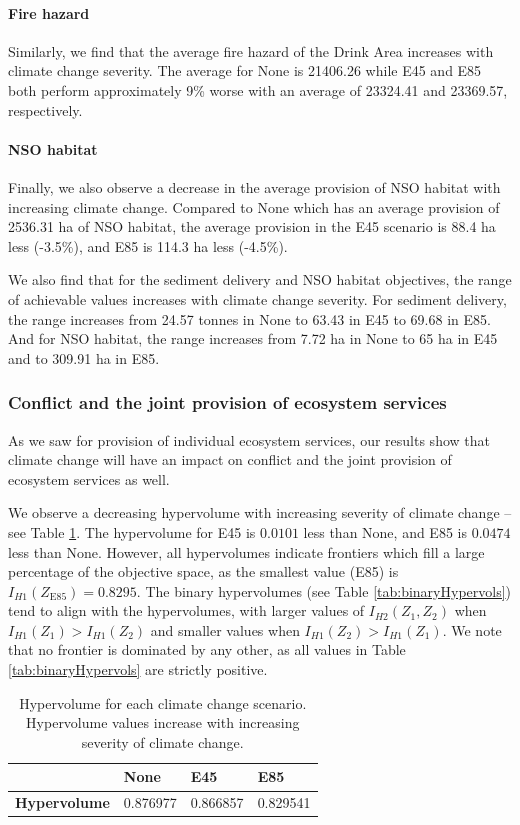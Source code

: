 \paragraph{Fire hazard}
Similarly, we find that the average fire hazard of the Drink Area increases with climate change severity. The average for None is 21406.26 while E45 and E85 both perform approximately 9\% worse with an average of 23324.41 and 23369.57, respectively.

\paragraph{NSO habitat}
Finally, we also observe a decrease in the average provision of NSO habitat with increasing climate change. Compared to None which has an average provision of 2536.31 ha of NSO habitat, the average provision in the E45 scenario is 88.4 ha less (-3.5\%), and E85 is 114.3 ha less (-4.5\%).

We also find that for the sediment delivery and NSO habitat objectives, the range of achievable values increases with climate change severity. For sediment delivery, the range increases from 24.57 tonnes in None to 63.43 in E45 to 69.68 in E85. And for NSO habitat, the range increases from 7.72 ha in None to 65 ha in E45 and to 309.91 ha in E85.

\subsubsection{Conflict and the joint provision of ecosystem services}
As we saw for provision of individual ecosystem services, our results show that climate change will have an impact on conflict and the joint provision of ecosystem services as well.

We observe a decreasing hypervolume with increasing severity of climate change -- see Table \ref{tab:hypervols}. The hypervolume for E45 is $0.0101$ less than None, and E85 is $0.0474$ less than None. However, all hypervolumes indicate frontiers which fill a large percentage of the objective space, as the smallest value (E85) is $I_{H1}(Z_\text{E85}) = 0.8295$. The binary hypervolumes (see Table \ref{tab:binaryHypervols}) tend to align with the hypervolumes, with larger values of $I_{H2}(Z_1,Z_2)$ when $I_{H1}(Z_1) > I_{H1}(Z_2)$ and smaller values when $I_{H1}(Z_2) > I_{H1}(Z_1)$. We note that no frontier is dominated by any other, as all values in Table \ref{tab:binaryHypervols} are strictly positive.

\begin{table}[]
\centering
\caption[Hypervolumes of the efficient frontiers]{Hypervolume for each climate change scenario. Hypervolume values increase with increasing severity of climate change.}
\label{tab:hypervols}
\begin{tabular}{lllll}
\multicolumn{2}{l}{}                                                  & \textbf{None} & \textbf{E45} & \textbf{E85} \\ \hline
\multicolumn{2}{l}{\textbf{Hypervolume}}                              & 0.876977      & 0.866857     & 0.829541       
\end{tabular}
\end{table} 

